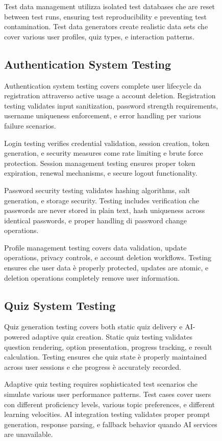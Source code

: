\documentclass[12pt,a4paper]{article}
\begin{document}
\begin{figure}[H]
Test data management utilizza isolated test databases che are reset between test runs, ensuring test reproducibility e preventing test contamination. Test data generators create realistic data sets che cover various user profiles, quiz types, e interaction patterns.

\subsection{Authentication System Testing}

Authentication system testing covers complete user lifecycle da registration attraverso active usage a account deletion. Registration testing validates input sanitization, password strength requirements, username uniqueness enforcement, e error handling per various failure scenarios.

Login testing verifies credential validation, session creation, token generation, e security measures come rate limiting e brute force protection. Session management testing ensures proper token expiration, renewal mechanisms, e secure logout functionality.

Password security testing validates hashing algorithms, salt generation, e storage security. Testing includes verification che passwords are never stored in plain text, hash uniqueness across identical passwords, e proper handling di password change operations.

Profile management testing covers data validation, update operations, privacy controls, e account deletion workflows. Testing ensures che user data è properly protected, updates are atomic, e deletion operations completely remove user information.

\subsection{Quiz System Testing}

Quiz generation testing covers both static quiz delivery e AI-powered adaptive quiz creation. Static quiz testing validates question rendering, option presentation, progress tracking, e result calculation. Testing ensures che quiz state è properly maintained across user sessions e che progress è accurately recorded.

Adaptive quiz testing requires sophisticated test scenarios che simulate various user performance patterns. Test cases cover users con different proficiency levels, various topic preferences, e different learning velocities. AI integration testing validates proper prompt generation, response parsing, e fallback behavior quando AI services are unavailable.


\end{figure}
\end{document}

